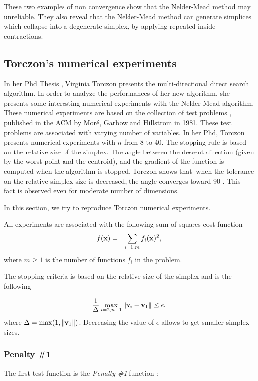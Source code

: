 These two examples of non convergence show that the Nelder-Mead method may unreliable.
They also reveal that the Nelder-Mead method can generate simplices which collapse 
into a degenerate simplex, by applying repeated inside contractions.

\subsection{Torczon's numerical experiments}

In her Phd Thesis \cite{Torczon89multi-directionalsearch}, Virginia Torczon 
presents the multi-directional direct search algorithm. In order to analyze the 
performances of her new algorithm, she presents some interesting numerical 
experiments with the Nelder-Mead algorithm. 
These numerical experiments are based on the collection of test problems \cite{355943},
published in the ACM by Mor\'e, Garbow and Hillstrom in 1981. 
These test problems are associated with varying number of variables.
In her Phd, Torczon presents numerical experiments with $n$ from 8 
to 40.
The stopping rule is based on the relative size of the simplex. 
The angle between the descent direction (given by the worst point and the centroid), and the
gradient of the function is computed when the algorithm is stopped.
Torczon shows that, when the tolerance on the relative simplex size is decreased, the 
angle converges toward 90 \degre. This fact is observed even for moderate 
number of dimensions.

In this section, we try to reproduce Torczon numerical experiments.

All experiments are associated with the following sum of squares cost function 
\begin{eqnarray}
\label{torzcon-sumofsquares}
f(\mathbf{x}) &=& \sum_{i=1,m} f_i(\mathbf{x})^2,
\end{eqnarray}
where $m\geq 1$ is the number of functions $f_i$ in the problem.

The stopping criteria is based on the relative size of the 
simplex and is the following 

\begin{eqnarray}
\label{torzcon-stopping}
\frac{1}{\Delta} \max_{i=2,n+1} \|\mathbf{v}_i - \mathbf{v}_1\| \leq \epsilon,
\end{eqnarray}
where $\Delta = \max( 1 , \|\mathbf{v}_1\| )$. Decreasing the value of 
$\epsilon$ allows to get smaller simplex sizes.

\subsubsection{Penalty \#1}
The first test function is the \emph{Penalty \#1} function :

